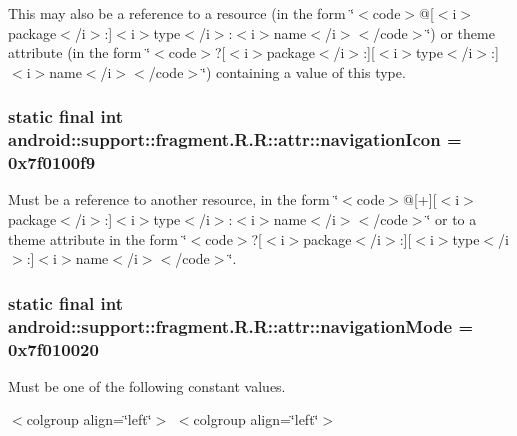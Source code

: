 This may also be a reference to a resource (in the form \char`\"{}$<$code$>$@\mbox{[}$<$i$>$package$<$/i$>$:\mbox{]}$<$i$>$type$<$/i$>$:$<$i$>$name$<$/i$>$$<$/code$>$\char`\"{}) or theme attribute (in the form \char`\"{}$<$code$>$?\mbox{[}$<$i$>$package$<$/i$>$:\mbox{]}\mbox{[}$<$i$>$type$<$/i$>$:\mbox{]}$<$i$>$name$<$/i$>$$<$/code$>$\char`\"{}) containing a value of this type. \hypertarget{classandroid_1_1support_1_1fragment_1_1_r_1_1attr_b23100edf5388a6e644d547f5aaa0618}{
\subsubsection[{navigationIcon}]{\setlength{\rightskip}{0pt plus 5cm}static final int android::support::fragment.R.R::attr::navigationIcon = 0x7f0100f9}}
\label{classandroid_1_1support_1_1fragment_1_1_r_1_1attr_b23100edf5388a6e644d547f5aaa0618}


Must be a reference to another resource, in the form \char`\"{}$<$code$>$@\mbox{[}+\mbox{]}\mbox{[}$<$i$>$package$<$/i$>$:\mbox{]}$<$i$>$type$<$/i$>$:$<$i$>$name$<$/i$>$$<$/code$>$\char`\"{} or to a theme attribute in the form \char`\"{}$<$code$>$?\mbox{[}$<$i$>$package$<$/i$>$:\mbox{]}\mbox{[}$<$i$>$type$<$/i$>$:\mbox{]}$<$i$>$name$<$/i$>$$<$/code$>$\char`\"{}. \hypertarget{classandroid_1_1support_1_1fragment_1_1_r_1_1attr_98aed434308896db52ff557d3e67faa8}{
\subsubsection[{navigationMode}]{\setlength{\rightskip}{0pt plus 5cm}static final int android::support::fragment.R.R::attr::navigationMode = 0x7f010020}}
\label{classandroid_1_1support_1_1fragment_1_1_r_1_1attr_98aed434308896db52ff557d3e67faa8}


Must be one of the following constant values. \begin{TabularC}{0}
\hline
\end{TabularC}
$<$colgroup align=\char`\"{}left\char`\"{}$>$ $<$colgroup align=\char`\"{}left\char`\"{}$>$ 

